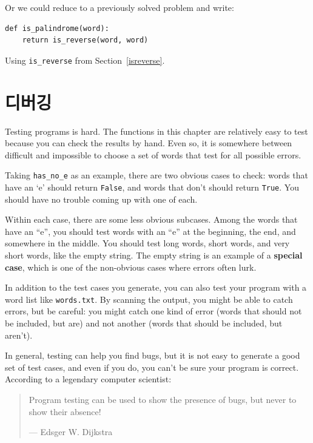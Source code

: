 \documentclass[10pt]{book}
\begin{document}
Or we could reduce to a previously solved
problem and write:

\begin{verbatim}
def is_palindrome(word):
    return is_reverse(word, word)
\end{verbatim}
%
Using \verb"is_reverse" from Section~\ref{isreverse}.


\section{디버깅}

Testing programs is hard.  The functions in this chapter are
relatively easy to test because you can check the results by hand.
Even so, it is somewhere between difficult and impossible to choose a
set of words that test for all possible errors.

Taking \verb"has_no_e" as an example, there are two obvious
cases to check: words that have an `e' should return {\tt False}, and
words that don't should return {\tt True}.  You should have no
trouble coming up with one of each.

Within each case, there are some less obvious subcases.  Among the
words that have an ``e'', you should test words with an ``e'' at the
beginning, the end, and somewhere in the middle.  You should test long
words, short words, and very short words, like the empty string.  The
empty string is an example of a {\bf special case}, which is one of
the non-obvious cases where errors often lurk.

In addition to the test cases you generate, you can also test
your program with a word list like {\tt words.txt}.  By scanning
the output, you might be able to catch errors, but be careful:
you might catch one kind of error (words that should not be
included, but are) and not another (words that should be included,
but aren't).

In general, testing can help you find bugs, but it is not easy to
generate a good set of test cases, and even if you do, you can't
be sure your program is correct.
According to a legendary computer scientist:

\begin{quote}
Program testing can be used to show the presence of bugs, but never to
show their absence!

--- Edsger W. Dijkstra
\end{quote}
\end{document}
